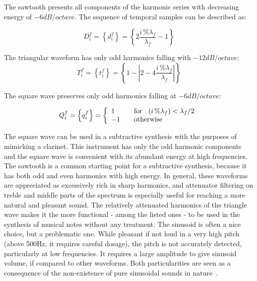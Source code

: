 The sawtooth presents all components of the harmonic series with decreasing energy of $-6dB/octave$. The sequence of temporal samples can be described as:

\begin{equation}\label{sawTooth}
     D^f_i=\left\{ d^f_i \right\}=\left\{ 2\frac{i\,\%\lambda_f}{\lambda_f} -1 \right\}
\end{equation}

The triangular waveform has only odd harmonics falling with $-12dB/octave$:
\begin{equation}\label{triangular}
     T^f_i=\left\{ t^f_i \right\}=\left\{1- \left| 2 - 4\frac{i\,\%\lambda_f}{\lambda_f} \right| \right\}
\end{equation}

The square wave preserves only odd harmonics falling at $-6dB/octave$:

\begin{equation}\label{square}
     Q^f_i=\left\{ q^f_i \right\}= \left\{
         \begin{array}{l l}
              1 & \quad \text{for } \; \; (i\,\%\lambda_f)   <  \lambda_f /2  \\
              -1 & \quad \text{otherwise}\\
         \end{array} \right.
\end{equation}


The square wave can be used in a subtractive synthesis with the purposes of mimicking a clarinet. This instrument has only the odd harmonic components and the square wave is convenient with its abundant energy at high frequencies.
The sawtooth is a common starting point for a subtractive synthesis, because it has both odd and even harmonics with high energy. In general, these waveforms are appreciated as excessively rich in sharp harmonics, and attenuator filtering on treble and middle parts of the spectrum is especially useful for reaching a more natural and pleasant sound. 
The relatively attenuated harmonics of the triangle wave makes it the more functional - among the listed ones - to be used in the synthesis of musical notes without any treatment. The sinusoid is often a nice choice, but a problematic one. While pleasant if not loud in a very high pitch (above 500Hz, it requires careful dosage), the pitch is not accurately detected, particularly at low frequencies. It requires a large amplitude to give sinusoid volume, if compared to other waveforms. Both particularities are seen as a consequence of the non-existence of pure sinusoidal sounds in nature~\cite{Roederer}.


